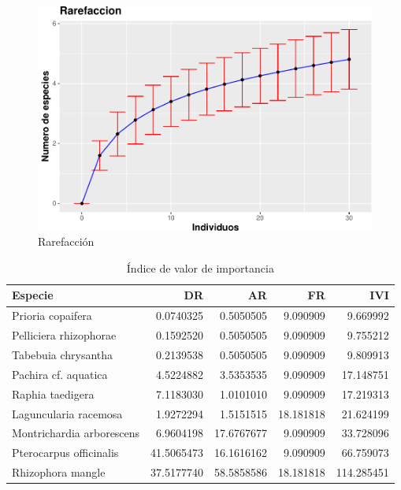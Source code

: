 \documentclass[conference,final,12pt,]{IEEEtran}
\makeatletter
\def\maxwidth{\ifdim\Gin@nat@width>\linewidth\linewidth
\else\Gin@nat@width\fi}
\let\Oldincludegraphics\includegraphics
\renewcommand{\includegraphics}[1]{\Oldincludegraphics[width=\maxwidth]{#1}}
\makeatother
\begin{document}
\begin{figure}
\centering
\includegraphics{mangrove_files/figure-latex/unnamed-chunk-5-1.pdf}
\caption{Rarefacción}
\end{figure}

\begin{table}

\caption{\label{tab:unnamed-chunk-6}Índice de valor de importancia}
\centering
\begin{tabular}[t]{l|r|r|r|r}
\hline
Especie & DR & AR & FR & IVI\\
\hline
Prioria copaifera & 0.0740325 & 0.5050505 & 9.090909 & 9.669992\\
\hline
Pelliciera rhizophorae & 0.1592520 & 0.5050505 & 9.090909 & 9.755212\\
\hline
Tabebuia chrysantha & 0.2139538 & 0.5050505 & 9.090909 & 9.809913\\
\hline
Pachira cf. aquatica & 4.5224882 & 3.5353535 & 9.090909 & 17.148751\\
\hline
Raphia taedigera & 7.1183030 & 1.0101010 & 9.090909 & 17.219313\\
\hline
Laguncularia racemosa & 1.9272294 & 1.5151515 & 18.181818 & 21.624199\\
\hline
Montrichardia arborescens & 6.9604198 & 17.6767677 & 9.090909 & 33.728096\\
\hline
Pterocarpus officinalis & 41.5065473 & 16.1616162 & 9.090909 & 66.759073\\
\hline
Rhizophora mangle & 37.5177740 & 58.5858586 & 18.181818 & 114.285451\\
\hline
\end{tabular}
\end{table}
\end{document}
